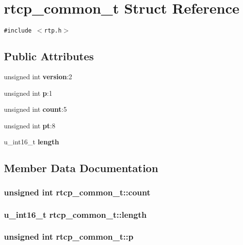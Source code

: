 \section{rtcp\_\-common\_\-t Struct Reference}
\label{structrtcp__common__t}
{\tt \#include $<$rtp.h$>$}

\subsection*{Public Attributes}
\begin{CompactItemize}
\item 
unsigned int {\bf version}:2
\item 
unsigned int {\bf p}:1
\item 
unsigned int {\bf count}:5
\item 
unsigned int {\bf pt}:8
\item 
u\_\-int16\_\-t {\bf length}
\end{CompactItemize}


\subsection{Member Data Documentation}
\subsubsection{\setlength{\rightskip}{0pt plus 5cm}unsigned int {\bf rtcp\_\-common\_\-t::count}}\label{structrtcp__common__t_o2}


\subsubsection{\setlength{\rightskip}{0pt plus 5cm}u\_\-int16\_\-t {\bf rtcp\_\-common\_\-t::length}}\label{structrtcp__common__t_o4}


\subsubsection{\setlength{\rightskip}{0pt plus 5cm}unsigned int {\bf rtcp\_\-common\_\-t::p}}\label{structrtcp__common__t_o1}


